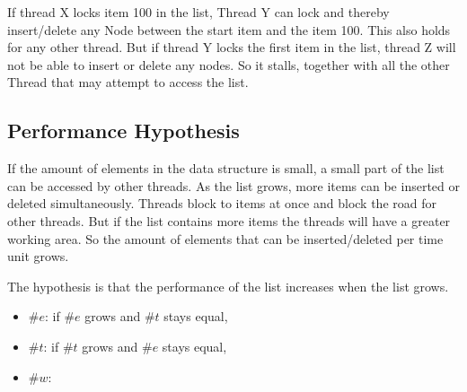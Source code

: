 \documentclass[10pt,a4paper]{article}
\begin{document}
If thread X locks item 100 in the list, Thread Y can lock and thereby
insert/delete any Node between the start item and the item 100. This
also holds for any other thread. But if thread Y locks the first item in the
list, thread Z will not be able to insert or delete any nodes. So it stalls,
together with all the other Thread that may attempt to access the list.

\subsection{Performance Hypothesis}
If the amount of elements in the data structure is small, a small part of the
list can be accessed by other threads. As the list grows, more items can be 
inserted or deleted simultaneously. Threads block to items at once and block
the road for other threads. But if the list contains more items the threads
will have a greater working area. So the amount of elements that can be inserted/deleted 
per time unit grows.

The hypothesis is that the performance of the list increases when the list 
grows. 

\begin{itemize}
 \item $\#e$:  if $\#e$ grows and $\#t$ stays equal, 
 \item $\#t$:  if $\#t$ grows and $\#e$ stays equal, 
 \item $\#w$:  
\end{itemize}
\end{document}

